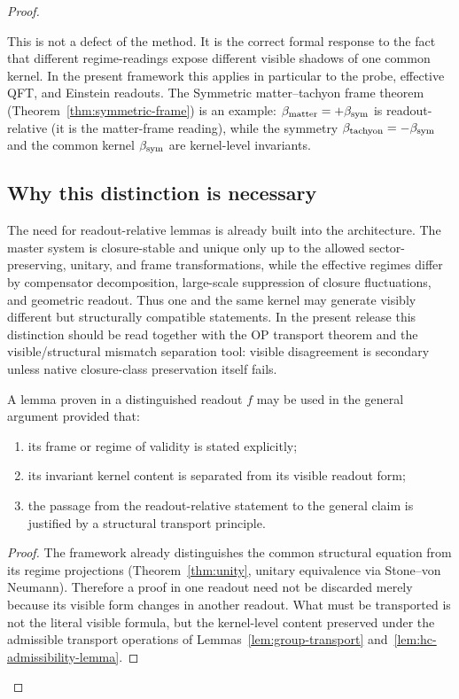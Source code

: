\begin{proof}
\begin{remark}
This is not a defect of the method. It is the correct formal response to
the fact that different regime-readings expose different visible shadows
of one common kernel. In the present framework this applies in particular
to the probe, effective QFT, and Einstein readouts.
The Symmetric matter--tachyon frame theorem (Theorem~\ref{thm:symmetric-frame})
is an example: $\beta_{\mathrm{matter}} = +\beta_{\mathrm{sym}}$ is readout-relative
(it is the matter-frame reading), while the symmetry
$\beta_{\mathrm{tachyon}} = -\beta_{\mathrm{sym}}$ and the common kernel $\beta_{\mathrm{sym}}$ are
kernel-level invariants.
\end{remark}

\subsection*{Why this distinction is necessary}

The need for readout-relative lemmas is already built into the
architecture. The master system is closure-stable and unique only up to
the allowed sector-preserving, unitary, and frame transformations, while
the effective regimes differ by compensator decomposition, large-scale
suppression of closure fluctuations, and geometric readout. Thus one and
the same kernel may generate visibly different but structurally
compatible statements. In the present release this distinction should be read together with the OP transport theorem and the visible/structural mismatch separation tool: visible disagreement is secondary unless native closure-class preservation itself fails.

\begin{proposition}
\label{prop:legitimacy-restricted-lemmas}
A lemma proven in a distinguished readout $f$ may be used in the general
argument provided that:
\begin{enumerate}[label=(\roman*)]
  \item its frame or regime of validity is stated explicitly;
  \item its invariant kernel content is separated from its visible
        readout form;
  \item the passage from the readout-relative statement to the general
        claim is justified by a structural transport principle.
\end{enumerate}
\end{proposition}

\begin{proof}
The framework already distinguishes the common structural equation from
its regime projections (Theorem~\ref{thm:unity}, unitary equivalence via
Stone--von Neumann). Therefore a proof in one readout need not be
discarded merely because its visible form changes in another readout.
What must be transported is not the literal visible formula, but the
kernel-level content preserved under the admissible transport operations
of Lemmas~\ref{lem:group-transport} and~\ref{lem:hc-admissibility-lemma}.
\end{proof}


\end{proof}

